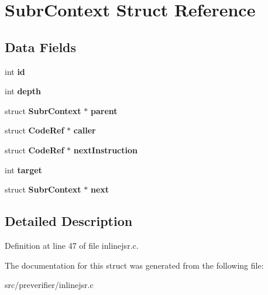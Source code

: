 \section{SubrContext Struct Reference}
\label{struct_subr_context}
\subsection*{Data Fields}
\begin{DoxyCompactItemize}
\item 
int {\bfseries id}\label{struct_subr_context_af740b50961b5b9525ffeaf3e20b27aef}

\item 
int {\bfseries depth}\label{struct_subr_context_a546c4be10c508bcac6af951dfc326282}

\item 
struct {\bf SubrContext} $\ast$ {\bfseries parent}\label{struct_subr_context_a4acc742fcff44afd79ef98578a7e4222}

\item 
struct {\bf CodeRef} $\ast$ {\bfseries caller}\label{struct_subr_context_a24da426080211b17d5669b80492a5dd7}

\item 
struct {\bf CodeRef} $\ast$ {\bfseries nextInstruction}\label{struct_subr_context_a62b2ae163a7a89fdd9db39400cafca87}

\item 
int {\bfseries target}\label{struct_subr_context_a0c5c87c4ea6231354584000b2ab29065}

\item 
struct {\bf SubrContext} $\ast$ {\bfseries next}\label{struct_subr_context_af9ae43c243128eb710afe4518c72d668}

\end{DoxyCompactItemize}


\subsection{Detailed Description}


Definition at line 47 of file inlinejsr.c.



The documentation for this struct was generated from the following file:\begin{DoxyCompactItemize}
\item 
src/preverifier/inlinejsr.c\end{DoxyCompactItemize}
